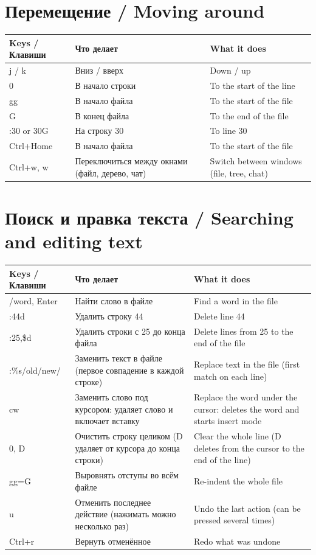 \documentclass[10pt]{article}
\newcommand{\hdr}[3]{\toprule \textbf{#1} & \textbf{#2} & \textbf{#3} \\ \midrule \endhead}
\begin{document}
\section*{Перемещение / Moving around}
\begin{longtable}{@{}K A B@{}}
\hdr{Keys / Клавиши}{Что делает}{What it does}
j / k & Вниз / вверх & Down / up \\
0 & В начало строки & To the start of the line \\
gg & В начало файла & To the start of the file \\
G & В конец файла & To the end of the file \\
:30 or 30G & На строку 30 & To line 30 \\
Ctrl+Home & В начало файла & To the start of the file \\
Ctrl+w, w & Переключиться между окнами (файл, дерево, чат) & Switch between windows (file, tree, chat) \\
\end{longtable}

\section*{Поиск и правка текста / Searching and editing text}
\begin{longtable}{@{}K A B@{}}
\hdr{Keys / Клавиши}{Что делает}{What it does}
/word, Enter & Найти слово в файле & Find a word in the file \\
:44d & Удалить строку 44 & Delete line 44 \\
:25,\$d & Удалить строки с 25 до конца файла & Delete lines from 25 to the end of the file \\
:\%s/old/new/ & Заменить текст в файле (первое совпадение в каждой строке) & Replace text in the file (first match on each line) \\
cw & Заменить слово под курсором: удаляет слово и включает вставку & Replace the word under the cursor: deletes the word and starts insert mode \\
0, D & Очистить строку целиком (D удаляет от курсора до конца строки) & Clear the whole line (D deletes from the cursor to the end of the line) \\
gg=G & Выровнять отступы во всём файле & Re-indent the whole file \\
u & Отменить последнее действие (нажимать можно несколько раз) & Undo the last action (can be pressed several times) \\
Ctrl+r & Вернуть отменённое & Redo what was undone \\
\end{longtable}
\end{document}
